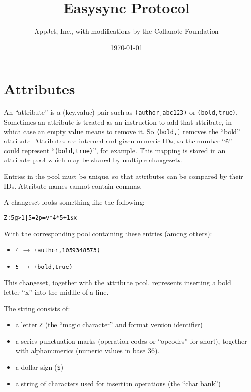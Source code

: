 \documentclass[12pt]{article}
\begin{document}
\title{Easysync Protocol}
\author{AppJet, Inc., with modifications by the Collanote Foundation}
\date{\today}

\maketitle

\section{Attributes}

An ``attribute'' is a (key,value) pair such as
\verb|(author,abc123)| or \verb|(bold,true)|.
Sometimes an attribute is treated as an instruction to add
that attribute, in which case an empty value means to
remove it.  So \verb|(bold,)| removes the ``bold''
attribute.  Attributes are interned and given numeric IDs,
so the number ``\verb|6|'' could represent
``\verb|(bold,true)|'', for example.  This mapping is
stored in an attribute pool which may be shared by
multiple changesets.

Entries in the pool must be unique, so that attributes can
be compared by their IDs.  Attribute names cannot contain
commas.

A changeset looks something like the following:

\begin{verbatim}
Z:5g>1|5=2p=v*4*5+1$x
\end{verbatim}

With the corresponding pool containing these entries (among others):

\begin{itemize}
\item[] \verb|4| $\rightarrow$ \verb|(author,1059348573)|
\item[] \verb|5| $\rightarrow$ \verb|(bold,true)|
\end{itemize}

This changeset, together with the attribute pool,
represents inserting a bold letter ``x'' into the middle
of a line.

The string consists of:

\begin{itemize}
\item a letter \verb|Z| (the ``magic character'' and
  format version identifier)
\item a series punctuation marks (operation codes or
  ``opcodes'' for short), together with alphanumerics
  (numeric values in base 36).
\item a dollar sign (\verb|$|)
\item a string of characters used for insertion operations
  (the ``char bank'')
\end{itemize}
\end{document}
